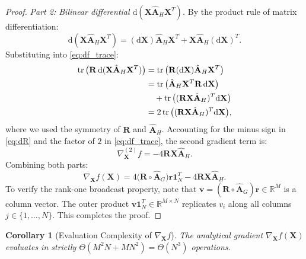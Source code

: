 \documentclass[conference]{IEEEtran}
\newtheorem{corollary}{Corollary}
\begin{document}
\begin{proof}
\textit{Part 2: Bilinear differential $\mathrm{d}(\mathbf{X}\hat{\mathbf{A}}_H\mathbf{X}^T)$.} By the product rule of matrix differentiation:
\begin{equation}
\mathrm{d}(\mathbf{X}\hat{\mathbf{A}}_H\mathbf{X}^T) = (\mathrm{d}\mathbf{X})\hat{\mathbf{A}}_H\mathbf{X}^T + \mathbf{X}\hat{\mathbf{A}}_H(\mathrm{d}\mathbf{X})^T.
\end{equation}
Substituting into \eqref{eq:df_trace}:
\begin{align}
\operatorname{tr}\big(\mathbf{R} \, \mathrm{d}(\mathbf{X}\hat{\mathbf{A}}_H\mathbf{X}^T)\big) &= \operatorname{tr}\big(\mathbf{R}(\mathrm{d}\mathbf{X})\hat{\mathbf{A}}_H\mathbf{X}^T\big) \notag\\
&= \operatorname{tr}\big(\hat{\mathbf{A}}_H\mathbf{X}^T\mathbf{R}\,\mathrm{d}\mathbf{X}\big) \notag\\
&\quad + \operatorname{tr}\big((\mathbf{R}\mathbf{X}\hat{\mathbf{A}}_H)^T\mathrm{d}\mathbf{X}\big) \notag\\
&= 2\operatorname{tr}\big((\mathbf{R}\mathbf{X}\hat{\mathbf{A}}_H)^T \mathrm{d}\mathbf{X}\big),
\end{align}
where we used the symmetry of $\mathbf{R}$ and $\hat{\mathbf{A}}_H$. Accounting for the minus sign in \eqref{eq:dR} and the factor of $2$ in \eqref{eq:df_trace}, the second gradient term is:
\begin{equation}
\nabla_{\mathbf{X}}^{(2)} f = -4\mathbf{R}\mathbf{X}\hat{\mathbf{A}}_H.
\end{equation}
Combining both parts:
\begin{equation}
\nabla_{\mathbf{X}} f(\mathbf{X}) = 4\big(\mathbf{R} \circ \hat{\mathbf{A}}_G\big)\mathbf{r}\mathbf{1}_N^T - 4\mathbf{R}\mathbf{X}\hat{\mathbf{A}}_H.
\end{equation}
To verify the rank-one broadcast property, note that $\mathbf{v} = (\mathbf{R} \circ \hat{\mathbf{A}}_G)\mathbf{r} \in \mathbb{R}^M$ is a column vector. The outer product $\mathbf{v}\mathbf{1}_N^T \in \mathbb{R}^{M \times N}$ replicates $v_i$ along all columns $j \in \{1, \ldots, N\}$. This completes the proof.
\end{proof}

\begin{corollary}[Evaluation Complexity of $\nabla_{\mathbf{X}} f$]
\label{cor:gradient_complexity}
The analytical gradient $\nabla_{\mathbf{X}} f(\mathbf{X})$ evaluates in strictly $\Theta(M^2N + MN^2) = \Theta(N^3)$ operations.
\end{corollary}
\end{document}
